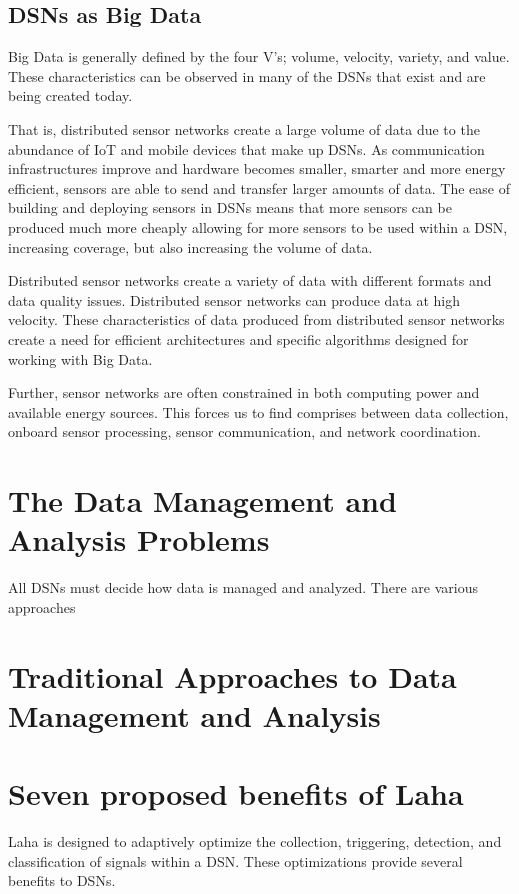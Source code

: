 \subsection{DSNs as Big Data}
Big Data is generally defined by the four V's; volume, velocity, variety, and value. These characteristics can be observed in many of the DSNs that exist and are being created today. %

That is, distributed sensor networks create a large volume of data due to the abundance of IoT and mobile devices that make up DSNs. As communication infrastructures improve and hardware becomes smaller, smarter and more energy efficient, sensors are able to send and transfer larger amounts of data. The ease of building and deploying sensors in DSNs means that more sensors can be produced much more cheaply allowing for more sensors to be used within a DSN, increasing coverage, but also increasing the volume of data.

Distributed sensor networks create a variety of data with different formats and data quality issues. Distributed sensor networks can produce data at high velocity. These characteristics of data produced from distributed sensor networks create a need for efficient architectures and specific algorithms designed for working with Big Data.

Further, sensor networks are often constrained in both computing power and available energy sources. This forces us to find comprises between data collection, onboard sensor processing, sensor communication, and network coordination.

\section{The Data Management and Analysis Problems}
All DSNs must decide how data is managed and analyzed. There are various approaches 

\section{Traditional Approaches to Data Management and Analysis}

\section{Seven proposed benefits of Laha} \label{laha-benefits}
Laha is designed to adaptively optimize the collection, triggering, detection, and classification of signals within a DSN. These optimizations provide several benefits to DSNs.

